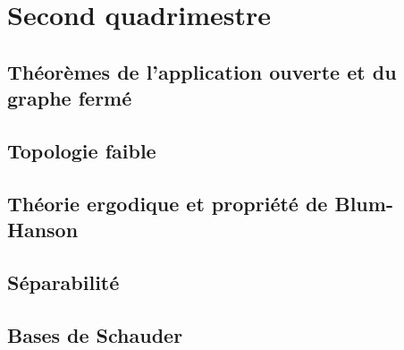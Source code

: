 \documentclass[a4paper, 12pt]{book}
\theoremstyle{definition} \newtheorem{df}{D\'{e}finition}[chapter]
\theoremstyle{definition} \newtheorem{ex}[df]{Exemple}
\theoremstyle{definition} \newtheorem{thm}[df]{Th\'{e}or\`{e}me}
\theoremstyle{definition} \newtheorem{cor}[df]{Corollaire}
\theoremstyle{definition} \newtheorem{lem}[df]{Lemme}
\theoremstyle{definition} \newtheorem{prop}[df]{Proposition}
\theoremstyle{definition} \newtheorem{rem}[df]{Remarque}
\theoremstyle{definition} \newtheorem{exo}{Exercice}[chapter]
\begin{document}
\part{Second quadrimestre}
\chapter{Théorèmes de l'application ouverte et du graphe fermé}



\chapter{Topologie faible}


\chapter{Théorie ergodique et propriété de Blum-Hanson}


\chapter{Séparabilité}


\chapter{Bases de Schauder}

\appendix




\end{document}
